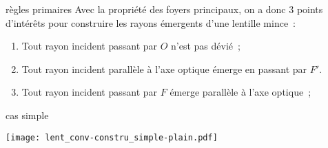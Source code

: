 \documentclass[../main/main.tex]{subfiles}
\begin{document}
\begin{tcbraster}[raster columns=2, raster equal height=rows]
    \begin{ror}[label=impo:lent_regles, hand]{règles primaires}
        Avec la propriété des foyers principaux, on a donc 3 points d'intérêts
        pour construire les rayons émergents d'une lentille mince~:
        \begin{enumerate}
            \item Tout rayon incident passant par $O$ n'est pas dévié~;
            \item Tout rayon incident parallèle à l'axe optique émerge en
                passant par $F'$.
            \item Tout rayon incident passant par $F$ émerge parallèle à l'axe
                optique~;
        \end{enumerate}
    \end{ror}
    \begin{exem}[label=exem:constru]{cas simple}
        \begin{center}
            \texttt{[image: lent\_conv-constru\_simple-plain.pdf]}
            \label{fig:convconstrusimple}
        \end{center}
    \end{exem}
\end{tcbraster}
\end{document}
